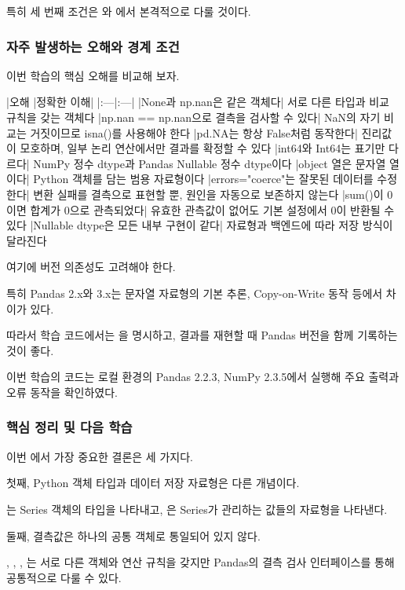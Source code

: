 특히 세 번째 조건은 와 에서 본격적으로 다룰 것이다.

\subsubsection{자주 발생하는 오해와 경계 조건}

이번 학습의 핵심 오해를 비교해 보자.

\begin{dhktable}
|오해	|정확한 이해|
|:---|:---|
|None과 np.nan은 같은 객체다|	서로 다른 타입과 비교 규칙을 갖는 객체다
|np.nan == np.nan으로 결측을 검사할 수 있다|	NaN의 자기 비교는 거짓이므로 isna()를 사용해야 한다
|pd.NA는 항상 False처럼 동작한다|	진리값이 모호하며, 일부 논리 연산에서만 결과를 확정할 수 있다
|int64와 Int64는 표기만 다르다|	NumPy 정수 dtype과 Pandas Nullable 정수 dtype이다
|object 열은 문자열 열이다|	Python 객체를 담는 범용 자료형이다
|errors="coerce"는 잘못된 데이터를 수정한다|	변환 실패를 결측으로 표현할 뿐, 원인을 자동으로 보존하지 않는다
|sum()이 0이면 합계가 0으로 관측되었다|	유효한 관측값이 없어도 기본 설정에서 0이 반환될 수 있다
|Nullable dtype은 모든 내부 구현이 같다|	자료형과 백엔드에 따라 저장 방식이 달라진다
\end{dhktable}

여기에 버전 의존성도 고려해야 한다.

특히 Pandas 2.x와 3.x는 문자열 자료형의 기본 추론, Copy-on-Write 동작 등에서 차이가 있다.

따라서 학습 코드에서는 을 명시하고, 결과를 재현할 때 Pandas 버전을 함께 기록하는 것이 좋다.

이번 학습의 코드는 로컬 환경의 Pandas 2.2.3, NumPy 2.3.5에서 실행해 주요 출력과 오류 동작을 확인하였다.

\subsubsection{핵심 정리 및 다음 학습}

이번 에서 가장 중요한 결론은 세 가지다.

첫째, Python 객체 타입과 데이터 저장 자료형은 다른 개념이다.

는 Series 객체의 타입을 나타내고, 은 Series가 관리하는 값들의 자료형을 나타낸다.

둘째, 결측값은 하나의 공통 객체로 통일되어 있지 않다.

, , , 는 서로 다른 객체와 연산 규칙을 갖지만 Pandas의 결측 검사 인터페이스를 통해 공통적으로 다룰 수 있다.

